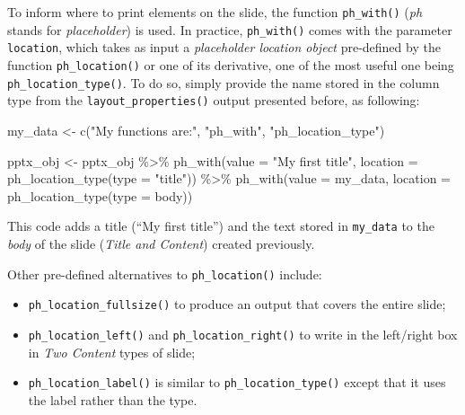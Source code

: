 \documentclass[
]{krantz}
\makeatletter
\newenvironment{Shaded}{\begin{snugshade}}{\end{snugshade}}
\newcommand{\AttributeTok}[1]{\textcolor[rgb]{0.61,0.61,0.61}{#1}}
\newcommand{\FunctionTok}[1]{\textcolor[rgb]{0,0,0}{#1}}
\newcommand{\NormalTok}[1]{#1}
\newcommand{\OtherTok}[1]{\textcolor[rgb]{0.37,0.37,0.37}{#1}}
\newcommand{\SpecialCharTok}[1]{\textcolor[rgb]{0,0,0}{#1}}
\newcommand{\StringTok}[1]{\textcolor[rgb]{0.5,0.5,0.5}{#1}}
\providecommand{\tightlist}{%
  \setlength{\itemsep}{0pt}\setlength{\parskip}{0pt}}
\newenvironment{kframe}{%
\medskip{}
\setlength{\fboxsep}{.8em}
 \def\at@end@of@kframe{}%
 \ifinner\ifhmode%
  \def\at@end@of@kframe{\end{minipage}}%
  \begin{minipage}{\columnwidth}%
 \fi\fi%
 \def\FrameCommand##1{\hskip\@totalleftmargin \hskip-\fboxsep
 \colorbox{shadecolor}{##1}\hskip-\fboxsep
     \hskip-\linewidth \hskip-\@totalleftmargin \hskip\columnwidth}%
 \MakeFramed {\advance\hsize-\width
   \@totalleftmargin\z@ \linewidth\hsize
   \@setminipage}}%
 {\par\unskip\endMakeFramed%
 \at@end@of@kframe}
\renewenvironment{Shaded}{\begin{kframe}}{\end{kframe}}
\makeatother
\begin{document}
To inform where to print elements on the slide, the function \texttt{ph\_with()} (\emph{ph} stands for \emph{placeholder}) is used. In practice, \texttt{ph\_with()} comes with the parameter \texttt{location}, which takes as input a \emph{placeholder location object} pre-defined by the function \texttt{ph\_location()} or one of its derivative, one of the most useful one being \texttt{ph\_location\_type()}. To do so, simply provide the name stored in the column type from the \texttt{layout\_properties()} output presented before, as following:

\begin{Shaded}
\begin{Highlighting}[]
\NormalTok{my\_data }\OtherTok{\textless{}{-}} \FunctionTok{c}\NormalTok{(}\StringTok{"My functions are:"}\NormalTok{, }\StringTok{"ph\_with"}\NormalTok{, }\StringTok{"ph\_location\_type"}\NormalTok{)}

\NormalTok{pptx\_obj }\OtherTok{\textless{}{-}}\NormalTok{ pptx\_obj }\SpecialCharTok{\%\textgreater{}\%}
  \FunctionTok{ph\_with}\NormalTok{(}\AttributeTok{value =} \StringTok{"My first title"}\NormalTok{, }
          \AttributeTok{location =} \FunctionTok{ph\_location\_type}\NormalTok{(}\AttributeTok{type =} \StringTok{"title"}\NormalTok{)) }\SpecialCharTok{\%\textgreater{}\%} 
  \FunctionTok{ph\_with}\NormalTok{(}\AttributeTok{value =}\NormalTok{ my\_data, }
          \AttributeTok{location =} \FunctionTok{ph\_location\_type}\NormalTok{(}\AttributeTok{type =} \StringTok{\textquotesingle{}body\textquotesingle{}}\NormalTok{))}
\end{Highlighting}
\end{Shaded}

This code adds a title (``My first title'') and the text stored in \texttt{my\_data} to the \emph{body} of the slide (\emph{Title and Content}) created previously.

Other pre-defined alternatives to \texttt{ph\_location()} include:

\begin{itemize}
\tightlist
\item
  \texttt{ph\_location\_fullsize()} to produce an output that covers the entire slide;
\item
  \texttt{ph\_location\_left()} and \texttt{ph\_location\_right()} to write in the left/right box in \emph{Two Content} types of slide;
\item
  \texttt{ph\_location\_label()} is similar to \texttt{ph\_location\_type()} except that it uses the label rather than the type.
\end{itemize}
\end{document}
